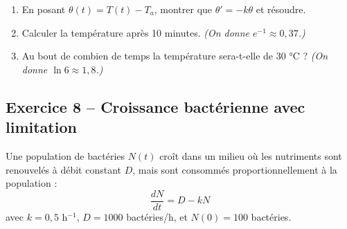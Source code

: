 \begin{enumerate}
    \item En posant $\theta(t) = T(t) - T_a$, montrer que $\theta' = -k\theta$ et résoudre.
    
    
    \item Calculer la température après 10 minutes. \textit{(On donne $e^{-1} \approx 0{,}37$.)}
    
    
    \item Au bout de combien de temps la température sera-t-elle de 30 °C ? \textit{(On donne $\ln 6 \approx 1{,}8$.)}
    
\end{enumerate}

\subsection*{Exercice 8 -- Croissance bactérienne avec limitation}

Une population de bactéries $N(t)$ croît dans un milieu où les nutriments sont renouvelés à débit constant $D$, mais sont consommés proportionnellement à la population :
\[
\frac{dN}{dt} = D - kN
\]
avec $k = 0{,}5$ h$^{-1}$, $D = 1000$ bactéries/h, et $N(0) = 100$ bactéries.

